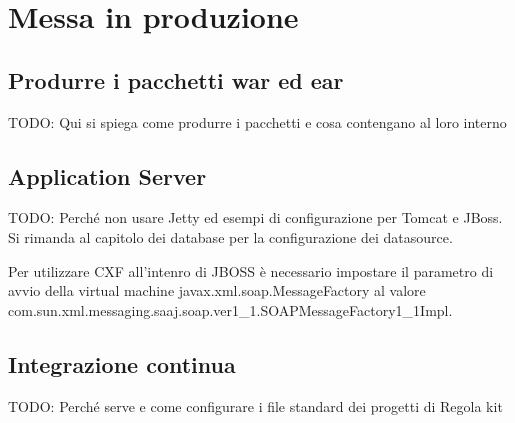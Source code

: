 \chapter{Messa in produzione}\label{chap:produzione}

\section{Produrre i pacchetti war ed ear}
TODO: Qui si spiega come produrre i pacchetti e cosa contengano al loro interno

\section{Application Server}\label{sec:datasource}
TODO: Perché non usare Jetty ed esempi di configurazione per Tomcat e JBoss. Si rimanda al capitolo dei database per la configurazione dei datasource.

Per utilizzare CXF all'intenro di JBOSS è necessario impostare il parametro di avvio della virtual machine javax.xml.soap.MessageFactory al valore com.sun.xml.messaging.saaj.soap.ver1\_1.SOAPMessageFactory1\_1Impl.



\section{Integrazione continua}
TODO: Perché serve e come configurare i file standard dei progetti di Regola kit